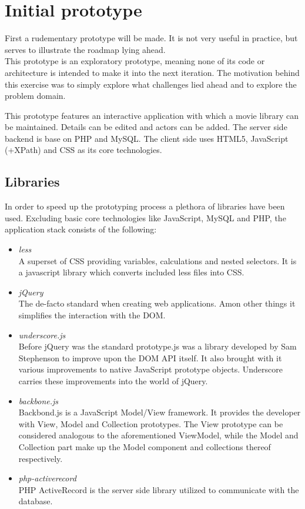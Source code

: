 \documentclass[twoside,11pt,openright]{report}
\begin{document}
\section{Initial prototype}
First a rudementary prototype will be made. It is not very
useful in practice, but serves to illustrate the roadmap lying ahead.\\
This prototype is an exploratory prototype, meaning none of its code or
architecture is intended to make it into the next iteration. The motivation
behind this exercise was to simply explore what challenges lied ahead and to
explore the problem domain.

This prototype features an interactive application with which a movie
library can be maintained. Details can be edited and actors can be
added.
The server side backend is base on PHP and MySQL. The client side uses
HTML5, JavaScript (+XPath) and CSS as its core technologies.

\subsection{Libraries}
In order to speed up the prototyping process a plethora of libraries have been
used. Excluding basic core technologies like JavaScript, MySQL and PHP, the
application stack consists of the following:
\begin{itemize}
	\item \emph{less}\\
	A superset of CSS providing variables, calculations and nested selectors. It
	is a javascript library which converts included less files into CSS.
	\item \emph{jQuery}\\
	The de-facto standard when creating web applications. Amon other things it
	simplifies the interaction with the DOM.
	\item \emph{underscore.js}\\
	Before jQuery was the standard prototype.js was a library developed by
	Sam Stephenson to improve upon the DOM API itself. It also brought with it
	various improvements to native JavaScript prototype objects. Underscore
	carries these improvements into the world of jQuery.
	\item \emph{backbone.js}\\
	Backbond.js is a JavaScript Model/View framework. It provides the developer
	with View, Model and Collection prototypes. The View prototype can be
	considered analogous to the aforementioned ViewModel, while the Model and
	Collection part make up the Model component and collections thereof
	respectively.
	\item \emph{php-activerecord}\\
	PHP ActiveRecord is the server side library utilized to communicate with the
	database.
	
\end{itemize}
\end{document}
